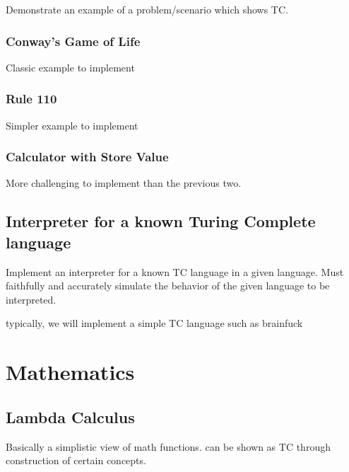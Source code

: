 Demonstrate an example of a problem/scenario which shows TC.

\subsubsection{Conway's Game of Life}

Classic example to implement

\subsubsection{Rule 110}

Simpler example to implement

\subsubsection{Calculator with Store Value}

More challenging to implement than the previous two.

\subsection{Interpreter for a known Turing Complete language}

Implement an interpreter for a known TC language in a given language.
Must faithfully and accurately simulate the behavior of the given language to be interpreted.

typically, we will implement a simple TC language such as brainfuck

\section{Mathematics}

\subsection{Lambda Calculus}

Basically a simplistic view of math functions.
can be shown as TC through construction of certain concepts.